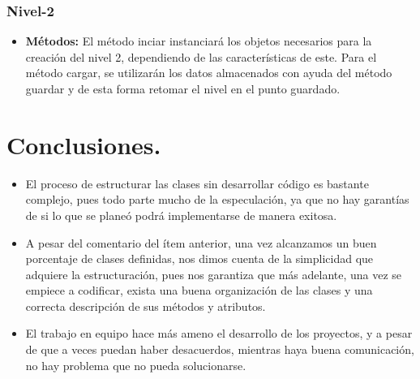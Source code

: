 \documentclass{article}
\begin{document}
    \subsubsection{Nivel-2}
    \begin{itemize}
        \item \textbf{Métodos:} El método inciar instanciará los objetos necesarios para la creación del nivel 2, dependiendo de las características de este. Para el método cargar, se utilizarán los datos almacenados con ayuda del método guardar y de esta forma retomar el nivel en el punto guardado.
    \end{itemize}

\section{Conclusiones.}
    \begin{itemize}
        \item El proceso de estructurar las clases sin desarrollar código es bastante complejo, pues todo parte mucho de la especulación, ya que no hay garantías de si lo que se planeó podrá implementarse de manera exitosa.
        
        \item A pesar del comentario del ítem anterior, una vez alcanzamos un buen porcentaje de clases definidas, nos dimos cuenta de la simplicidad que adquiere la estructuración, pues nos garantiza que más adelante, una vez se empiece a codificar, exista una buena organización de las clases y una correcta descripción de sus métodos y atributos.
        
        \item El trabajo en equipo hace más ameno el desarrollo de los proyectos, y a pesar de que a veces puedan haber desacuerdos, mientras haya buena comunicación, no hay problema que no pueda solucionarse.
    \end{itemize}
\end{document}
